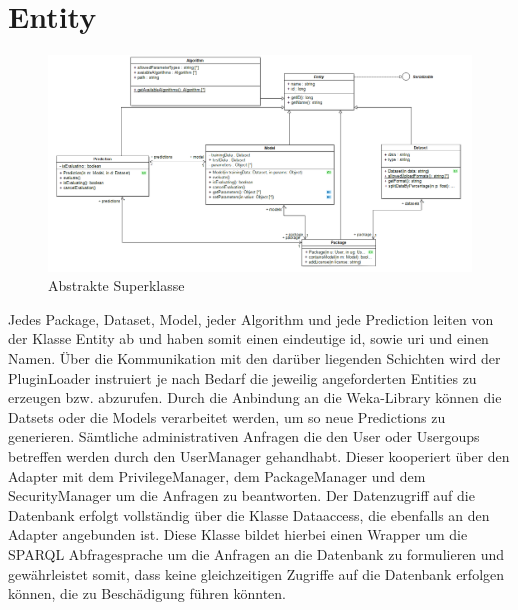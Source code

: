 \section{Entity}

\begin{figure}[h]
\centering
\includegraphics[width=1.0\linewidth]{Grafik/Klassendiagramme/Entity.png}
\caption{Abstrakte Superklasse}
\end{figure}

Jedes Package, Dataset, Model, jeder Algorithm und jede Prediction leiten von der Klasse Entity ab und haben somit einen eindeutige id, sowie uri und einen Namen. Über die Kommunikation mit den darüber liegenden Schichten wird der PluginLoader instruiert je nach Bedarf die jeweilig angeforderten Entities zu erzeugen bzw. abzurufen. Durch die Anbindung an die Weka-Library können die Datsets oder die Models verarbeitet werden, um so neue Predictions zu generieren.
Sämtliche administrativen Anfragen die den User oder Usergoups betreffen werden durch den UserManager gehandhabt. Dieser kooperiert über den Adapter mit dem PrivilegeManager, dem PackageManager und dem SecurityManager um die Anfragen zu beantworten.
Der Datenzugriff auf die Datenbank erfolgt vollständig über die Klasse Dataaccess, die ebenfalls an den Adapter angebunden ist. Diese Klasse bildet hierbei einen Wrapper um die SPARQL Abfragesprache um die Anfragen an die Datenbank zu formulieren und gewährleistet somit, dass keine gleichzeitigen Zugriffe auf die Datenbank erfolgen können, die zu Beschädigung führen könnten.